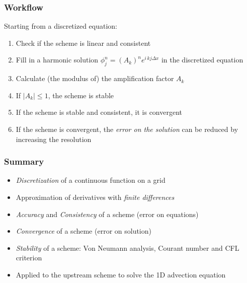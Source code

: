 \documentclass[aspectratio=43,9pt]{beamer}
\begin{document}
\begin{frame}
	\frametitle{Workflow}
	Starting from a discretized equation:\vspace*{2ex}
	\begin{enumerate}
		\item Check if the scheme is linear and consistent\vspace*{1ex}
		\item Fill in a harmonic solution $\phi_j^n=(A_k)^n e^{i\,kj\Delta x}$ in the discretized equation\vspace*{1ex}
		\item Calculate (the modulus of) the amplification factor $A_k$\vspace*{1ex}
		\item If $|A_k| \leq 1$, the scheme is stable\vspace*{1ex}
		\item If the scheme is stable and consistent, it is convergent\vspace*{1ex}
		\item If the scheme is convergent, the \emph{error on the solution} can be reduced by increasing the resolution
	\end{enumerate}
\end{frame}
%
%
\begin{frame}
	\frametitle{Summary}
	\begin{itemize}
		\item \emph{Discretization} of a continuous function on a grid\vspace*{2ex}
		\item Approximation of derivatives with \emph{finite differences}\vspace*{2ex}
		\item \emph{Accuracy} and \emph{Consistency} of a scheme (error on equations)\vspace*{2ex}
		\item \emph{Convergence} of a scheme (error on solution)\vspace*{2ex}
		\item \emph{Stability} of a scheme: Von Neumann analysis, Courant number and CFL criterion\vspace*{2ex}
		\item Applied to the upstream scheme to solve the 1D advection equation
	\end{itemize}
\end{frame}
%
%	
\end{document}
